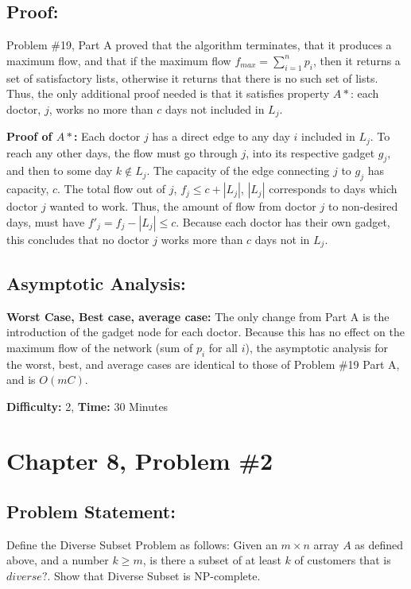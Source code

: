 \documentclass{article}
\begin{document}
\subsection*{Proof:}
Problem \#19, Part A proved that the algorithm terminates, that it produces a maximum flow, and that if the maximum flow $f_{max} = \sum_{i=1}^n p_i$, then it returns a set of satisfactory lists, otherwise it returns that there is no such set of lists.  Thus, the only additional proof needed is that it satisfies property $A*$: each doctor, $j$, works no more than $c$ days not included in $L_j$.  

\noindent \textbf{Proof of $A*$:}  Each doctor $j$ has a direct edge to any day $i$ included in $L_j$.  To reach any other days, the flow must go through $j$, into its respective gadget $g_j$, and then to some day $k \notin L_j$.  The capacity of the edge connecting $j$ to $g_j$ has capacity, $c$.  The total flow out of $j$, $f_j \leq c + |L_j|$, $|L_j| $ corresponds to days which doctor $j$ wanted to work.  Thus, the amount of flow from doctor $j$ to non-desired days, must have $f'_j = f_j - |L_j| \leq c$.  Because each doctor has their own gadget, this concludes that no doctor $j$ works more than $c$ days not in $L_j$.

\subsection*{Asymptotic Analysis:}
\noindent \textbf{Worst Case, Best case, average case:} The only change from Part A is the introduction of the gadget node for each doctor. Because this has no effect on the maximum flow of the network (sum of $p_i$ for all $i$), the asymptotic analysis for the worst, best, and average cases are identical to those of Problem \#19 Part A, and is $O(mC)$.

\noindent \textbf{Difficulty:}  2, \textbf{Time:}  30 Minutes

\newpage

\section*{Chapter 8, Problem \#2}

\subsection*{Problem Statement:}  
Define the Diverse Subset Problem as follows:  Given an $m \times n$ array $A$ as defined above, and a number $k \geq m$, is there a subset of at least $k$ of customers that is $diverse?$.
Show that Diverse Subset is NP-complete.
\end{document}
